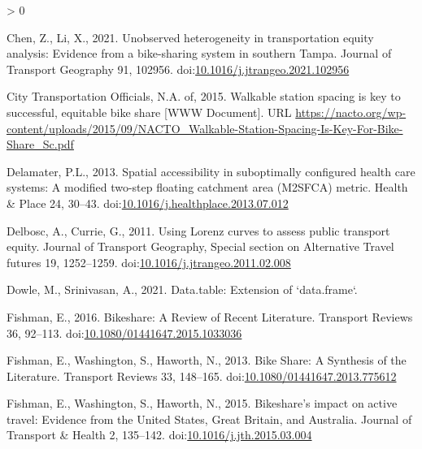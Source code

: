 \documentclass[]{elsarticle} %
\newlength{\cslhangindent}
\newenvironment{CSLReferences}[2] %
 {%
  \setlength{\parindent}{0pt}
  \ifodd #1 \everypar{\setlength{\hangindent}{\cslhangindent}}\ignorespaces\fi
  \ifnum #2 > 0
  \setlength{\parskip}{#2\baselineskip}
  \fi
 }%
 {}
\begin{document}
\begin{CSLReferences}{1}{0}
\leavevmode\hypertarget{ref-chenUnobservedHeterogeneityTransportation2021}{}%
Chen, Z., Li, X., 2021. Unobserved heterogeneity in transportation
equity analysis: {Evidence} from a bike-sharing system in southern
{Tampa}. Journal of Transport Geography 91, 102956.
doi:\href{https://doi.org/10.1016/j.jtrangeo.2021.102956}{10.1016/j.jtrangeo.2021.102956}

\leavevmode\hypertarget{ref-nactowalkingstation2015}{}%
City Transportation Officials, N.A. of, 2015. Walkable station spacing
is key to successful, equitable bike share {[}WWW Document{]}. URL
\url{https://nacto.org/wp-content/uploads/2015/09/NACTO_Walkable-Station-Spacing-Is-Key-For-Bike-Share_Sc.pdf}

\leavevmode\hypertarget{ref-delamaterSpatialAccessibilitySuboptimally2013}{}%
Delamater, P.L., 2013. Spatial accessibility in suboptimally configured
health care systems: {A} modified two-step floating catchment area
({M2SFCA}) metric. Health \& Place 24, 30--43.
doi:\href{https://doi.org/10.1016/j.healthplace.2013.07.012}{10.1016/j.healthplace.2013.07.012}

\leavevmode\hypertarget{ref-delboscUsingLorenzCurves2011}{}%
Delbosc, A., Currie, G., 2011. Using {Lorenz} curves to assess public
transport equity. Journal of Transport Geography, Special section on
{Alternative Travel} futures 19, 1252--1259.
doi:\href{https://doi.org/10.1016/j.jtrangeo.2011.02.008}{10.1016/j.jtrangeo.2011.02.008}

\leavevmode\hypertarget{ref-R-data.table}{}%
Dowle, M., Srinivasan, A., 2021. Data.table: Extension of `data.frame`.

\leavevmode\hypertarget{ref-fishmanBikeshareReviewRecent2016}{}%
Fishman, E., 2016. Bikeshare: {A Review} of {Recent Literature}.
Transport Reviews 36, 92--113.
doi:\href{https://doi.org/10.1080/01441647.2015.1033036}{10.1080/01441647.2015.1033036}

\leavevmode\hypertarget{ref-fishmanBikeShareSynthesis2013}{}%
Fishman, E., Washington, S., Haworth, N., 2013. Bike {Share}: {A
Synthesis} of the {Literature}. Transport Reviews 33, 148--165.
doi:\href{https://doi.org/10.1080/01441647.2013.775612}{10.1080/01441647.2013.775612}

\leavevmode\hypertarget{ref-fishmanBikeshareImpactActive2015}{}%
Fishman, E., Washington, S., Haworth, N., 2015. Bikeshare's impact on
active travel: {Evidence} from the {United States}, {Great Britain}, and
{Australia}. Journal of Transport \& Health 2, 135--142.
doi:\href{https://doi.org/10.1016/j.jth.2015.03.004}{10.1016/j.jth.2015.03.004}


\end{CSLReferences}
\end{document}
